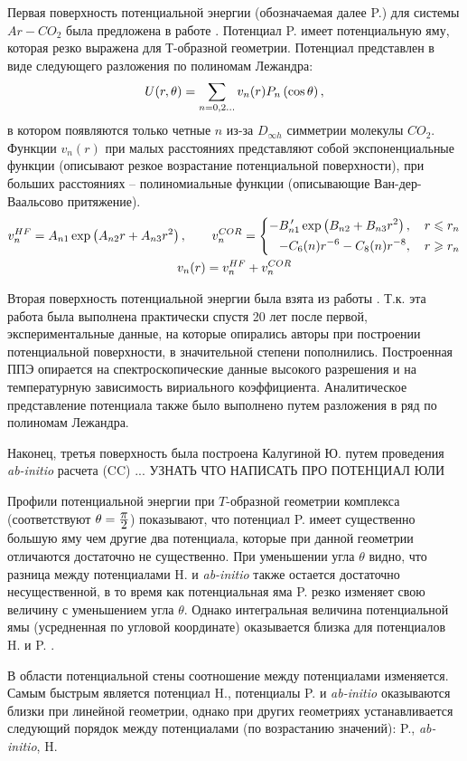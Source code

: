Первая поверхность потенциальной энергии (обозначаемая далее P.) для системы $Ar-CO_2$ была предложена в работе \cite{parker1976}. Потенциал P. имеет потенциальную яму, которая резко выражена для Т-образной геометрии. Потенциал представлен в виде следующего разложения по полиномам Лежандра:
\vverh
\begin{gather}
	U(r, \theta) = \sum_{n = 0, 2 \dots} v_n(r) P_n \left( \cos \theta \right), \notag
\end{gather}
в котором появляются только четные $n$ из-за $D_{\infty h}$ симметрии молекулы $CO_2$. Функции $v_n(r)$ при малых расстояниях представляют собой экспоненциальные функции (описывают резкое возрастание потенциальной поверхности), при больших расстояниях -- полиномиальные функции (описывающие Ван-дер-Ваальсово притяжение). 
\vverh
\begin{gather}
	v_n^{HF} = A_{n1} \exp \left( A_{n2} r + A_{n3} r^2 \right), \notag \quad \quad 
	v_n^{COR} = \left\{
	\begin{aligned}
		- B_{n1}^{\, \prime} \exp \left( B_{n2} + B_{n3} r^2 \right), \quad r \leqslant r_n \\
		-C_6(n) r^{-6} - C_8(n) r^{-8}, \quad r \geqslant r_n
	\end{aligned} \right. \notag \\
	v_n(r) = v_n^{HF} + v_n^{COR} \notag 
\end{gather}

Вторая поверхность потенциальной энергии была взята из работы \cite{hutson1996}. Т.к. эта работа была выполнена практически спустя 20 лет после первой, экспериментальные данные, на которые опирались авторы при построении потенциальной поверхности, в значительной степени пополнились. Построенная ППЭ опирается на спектроскопические данные высокого разрешения и на температурную зависимость вириального коэффициента. Аналитическое представление потенциала также было выполнено путем разложения в ряд по полиномам Лежандра.  

Наконец, третья поверхность была построена Калугиной Ю. путем проведения \textit{ab-initio} расчета (CC) ... 
УЗНАТЬ ЧТО НАПИСАТЬ ПРО ПОТЕНЦИАЛ ЮЛИ


Профили потенциальной энергии при $T$-образной геометрии комплекса (соответствуют $\theta = \frac{\displaystyle \pi}{\displaystyle 2}$) показывают, что потенциал P. имеет существенно большую яму чем другие два потенциала, которые при данной геометрии отличаются достаточно не существенно. При уменьшении угла $\theta$ видно, что разница между потенциалами H. и \textit{ab-initio} также остается достаточно несущественной, в то время как потенциальная яма P. резко изменяет свою величину с уменьшением угла $\theta$. Однако интегральная величина потенциальной ямы (усредненная по угловой координате) оказывается близка для потенциалов H. и P. \cite{hutson1996}. \par
В области потенциальной стены соотношение между потенциалами изменяется. Самым быстрым является потенциал H., потенциалы P. и \textit{ab-initio} оказываются близки при линейной геометрии, однако при других геометриях устанавливается следующий порядок между потенциалами (по возрастанию значений): P., \textit{ab-initio}, H.

